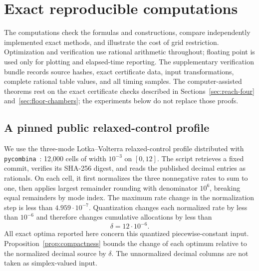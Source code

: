 \section{Exact reproducible computations}\label{sec:computations}

The computations check the formulas and constructions, compare independently
implemented exact methods, and illustrate the cost of grid restriction.
Optimization and verification use rational arithmetic throughout; floating
point is used only for plotting and elapsed-time reporting. The supplementary
verification bundle records source hashes, exact certificate data, input
transformations, complete rational table values, and all timing samples.
The computer-assisted theorems rest on the exact certificate checks described
in Sections~\ref{sec:reach-four} and~\ref{sec:floor-chambers}; the experiments
below do not replace those proofs.

\subsection{A pinned public relaxed-control profile}

We use the three-mode Lotka--Volterra relaxed-control profile distributed with
\texttt{pycombina}~\cite{pycombina-data}: 12,000 cells of width $10^{-3}$ on
$[0,12]$. The script retrieves a fixed commit, verifies its SHA-256 digest,
and reads the published decimal entries as rationals. On each cell, it first
normalizes the three nonnegative rates to sum to one, then applies largest
remainder rounding with denominator $10^6$, breaking equal remainders by mode
index. The maximum rate change in the normalization step is less than
$4.959\cdot10^{-7}$. Quantization changes each normalized rate by less than
$10^{-6}$ and therefore changes cumulative allocations by less than
\[
 \delta=12\cdot10^{-6}.
\]
All exact optima reported here concern this quantized piecewise-constant input.
Proposition~\ref{prop:compactness} bounds the change of each optimum relative
to the normalized decimal source by $\delta$. The unnormalized decimal
columns are not taken as simplex-valued input.

